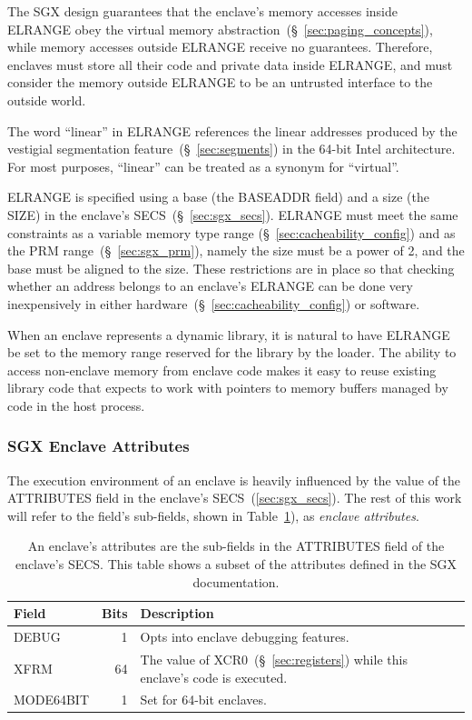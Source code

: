 The SGX design guarantees that the enclave's memory accesses inside ELRANGE
obey the virtual memory abstraction~(\S~\ref{sec:paging_concepts}), while
memory accesses outside ELRANGE receive no guarantees. Therefore, enclaves must
store all their code and private data inside ELRANGE, and must consider the
memory outside ELRANGE to be an untrusted interface to the outside world.

The word ``linear'' in ELRANGE references the linear addresses produced by the
vestigial segmentation feature~(\S~\ref{sec:segments}) in the 64-bit Intel
architecture. For most purposes, ``linear'' can be treated as a synonym for
``virtual''.

ELRANGE is specified using a base (the BASEADDR field) and a size (the SIZE)
in the enclave's SECS~(\S~\ref{sec:sgx_secs}). ELRANGE must meet the same
constraints as a variable memory type range (\S~\ref{sec:cacheability_config})
and as the PRM range~(\S~\ref{sec:sgx_prm}), namely the size must be a power of
2, and the base must be aligned to the size. These restrictions are in place
so that checking whether an address belongs to an enclave's ELRANGE can be done
very inexpensively in either hardware~(\S~\ref{sec:cacheability_config}) or
software.

When an enclave represents a dynamic library, it is natural to have ELRANGE be
set to the memory range reserved for the library by the loader. The ability to
access non-enclave memory from enclave code makes it easy to reuse existing
library code that expects to work with pointers to memory buffers managed by
code in the host process.


\subsubsection{SGX Enclave Attributes}
\label{sec:sgx_secs_attributes}

The execution environment of an enclave is heavily influenced by the value of
the ATTRIBUTES field in the enclave's SECS~(\ref{sec:sgx_secs}). The rest of
this work will refer to the field's sub-fields, shown in
Table~\ref{fig:sgx_secs_attributes}), as \textit{enclave attributes}.


\begin{table}[hbt]
  \centering
  \begin{tabularx}{\columnwidth}{| l | r | X |}
  \hline
  \textbf{Field} & \textbf{Bits} & \textbf{Description} \\
  \hline
  DEBUG & 1 & Opts into enclave debugging features. \\
  \hline
  XFRM & 64 & The value of XCR0~(\S~\ref{sec:registers}) while this enclave's
              code is executed. \\
  \hline
  MODE64BIT & 1 & Set for 64-bit enclaves. \\
  \hline
  \end{tabularx}
  \caption{
    An enclave's attributes are the sub-fields in the ATTRIBUTES field of the
    enclave's SECS. This table shows a subset of the attributes defined in the
    SGX documentation.
  }
  \label{fig:sgx_secs_attributes}
\end{table}


